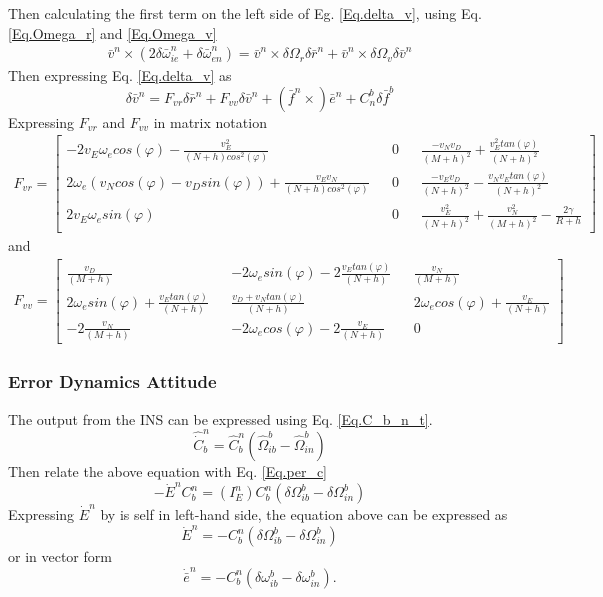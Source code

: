 Then calculating the first term on the left side of Eg. \eqref{Eq.delta_v}, using Eq. \eqref{Eq.Omega_r} and \eqref{Eq.Omega_v}
\begin{align}
\bar{v}^n\times(2\delta \bar{\omega}_{ie}^n+\delta \bar{\omega}_{en}^n) = 
\bar{v}^n \times \delta\Omega_r\delta\bar{r}^n +\bar{v}^n\times\delta\Omega_v\delta\bar{v}^n
\end{align}
Then expressing Eq. \eqref{Eq.delta_v} as
\begin{equation}
\delta\bar{v}^n = F_{vr}\delta\bar{r}^n + F_{vv}\delta\bar{v}^n + (\bar{f}^n	\times)\bar{e}^n + C_n^b\delta \bar{f}^b
\end{equation}
Expressing $F_{vr}$ and $F_{vv}$ in matrix notation
\begin{align}
F_{vr} = 
\begin{bmatrix}
-2v_E\omega_e cos(\varphi)-\frac{v_E^2}{(N+h)cos^2(\varphi)} && 0 && \frac{-v_N v_D}{(M+h)^2} + \frac{v_E^2 tan(\varphi)}{(N+h)^2} \\
2\omega_e(v_N cos(\varphi)-v_D sin(\varphi)) + \frac{v_Ev_N}{(N+h)cos^2(\varphi)} && 0 && \frac{-v_E v_D}{(N+h)^2} - \frac{v_Nv_E tan(\varphi)}{(N+h)^2} \\
2v_E\omega_e sin(\varphi) && 0 && \frac{v_E^2}{(N+h)^2} + \frac{v_N^2}{(M+h)^2} - \frac{2\gamma}{R+h}
\end{bmatrix}
\label{Eq.Fvr}
\end{align}
and
\begin{align}
F_{vv} = 
\begin{bmatrix}
\frac{v_D}{(M+h)} && -2\omega_e sin(\varphi) -2\frac{v_Etan(\varphi)}{(N+h)} && \frac{v_N}{(M+h)} \\
2\omega_e sin(\varphi) +\frac{v_E tan(\varphi)}{(N+h)} && \frac{v_D + v_N tan(\varphi)}{(N+h)} && 2\omega_e cos(\varphi)+ \frac{v_E}{(N+h)} \\
-2\frac{v_N}{(M+h)} && -2\omega_e cos(\varphi) -2\frac{v_E}{(N+h)} && 0
\end{bmatrix}
\label{Eq.Fvv}
\end{align}
\subsubsection{Error Dynamics Attitude}
The output from the INS can be expressed using Eq. \eqref{Eq.C_b_n_t}.
\begin{equation}
\hat{\dot{C}}_b^n = \hat{C}_b^n(\hat{\Omega}_{ib}^b - \hat{\Omega}_{in}^b)
\end{equation}
Then relate the above equation with Eq. \eqref{Eq.per_c}
\begin{equation}
-\dot{E}^nC_b^n = (I_E^n)C_b^n(\delta\Omega_{ib}^b-\delta\Omega_{in}^b)
\end{equation}
Expressing $\dot{E}^n$ by is self in left-hand side, the equation above can be expressed as
\begin{equation}
\dot{E}^n = -C_b^n(\delta\Omega_{ib}^b-\delta\Omega_{in}^b)
\end{equation}
or in vector form
\begin{equation}
\dot\bar{{e}}^n = -C_b^n(\delta\omega_{ib}^b-\delta\omega_{in}^b).
\label{Eq.error_vec}
\end{equation}

